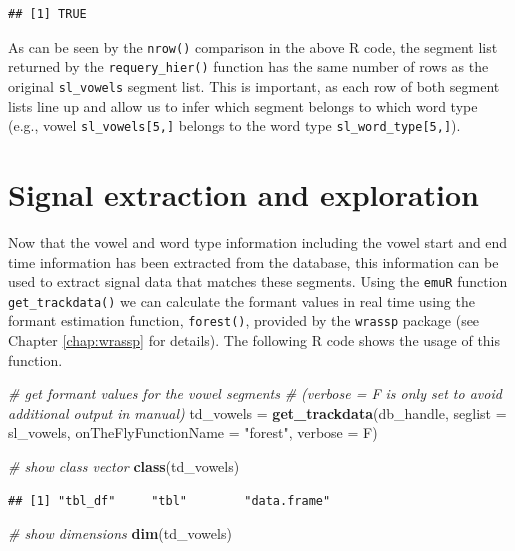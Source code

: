 \documentclass[]{book}
\newenvironment{Shaded}{\begin{snugshade}}{\end{snugshade}}
\newcommand{\CommentTok}[1]{\textcolor[rgb]{0.56,0.35,0.01}{\textit{#1}}}
\newcommand{\DataTypeTok}[1]{\textcolor[rgb]{0.13,0.29,0.53}{#1}}
\newcommand{\KeywordTok}[1]{\textcolor[rgb]{0.13,0.29,0.53}{\textbf{#1}}}
\newcommand{\NormalTok}[1]{#1}
\newcommand{\StringTok}[1]{\textcolor[rgb]{0.31,0.60,0.02}{#1}}
\begin{document}
\begin{verbatim}
## [1] TRUE
\end{verbatim}

As can be seen by the \texttt{nrow()} comparison in the above R code, the segment list returned by the \texttt{requery\_hier()} function has the same number of rows as the original \texttt{sl\_vowels} segment list. This is important, as each row of both segment lists line up and allow us to infer which segment belongs to which word type (e.g., vowel \texttt{sl\_vowels{[}5,{]}} belongs to the word type \texttt{sl\_word\_type{[}5,{]}}).

\hypertarget{section:tutorial-sigExtrAndExpl}{%
\section{Signal extraction and exploration}\label{section:tutorial-sigExtrAndExpl}}

Now that the vowel and word type information including the vowel start and end time information has been extracted from the database, this information can be used to extract signal data that matches these segments. Using the \texttt{emuR} function \texttt{get\_trackdata()} we can calculate the formant values in real time using the formant estimation function, \texttt{forest()}, provided by the \texttt{wrassp} package (see Chapter \ref{chap:wrassp} for details). The following R code shows the usage of this function.

\begin{Shaded}
\begin{Highlighting}[]
\CommentTok{# get formant values for the vowel segments}
\CommentTok{# (verbose = F is only set to avoid additional output in manual)}
\NormalTok{td_vowels =}\StringTok{ }\KeywordTok{get_trackdata}\NormalTok{(db_handle,}
                          \DataTypeTok{seglist =}\NormalTok{ sl_vowels,}
                          \DataTypeTok{onTheFlyFunctionName =} \StringTok{"forest"}\NormalTok{,}
                          \DataTypeTok{verbose =}\NormalTok{ F)}

\CommentTok{# show class vector}
\KeywordTok{class}\NormalTok{(td_vowels)}
\end{Highlighting}
\end{Shaded}

\begin{verbatim}
## [1] "tbl_df"     "tbl"        "data.frame"
\end{verbatim}

\begin{Shaded}
\begin{Highlighting}[]
\CommentTok{# show dimensions}
\KeywordTok{dim}\NormalTok{(td_vowels)}
\end{Highlighting}
\end{Shaded}
\end{document}
